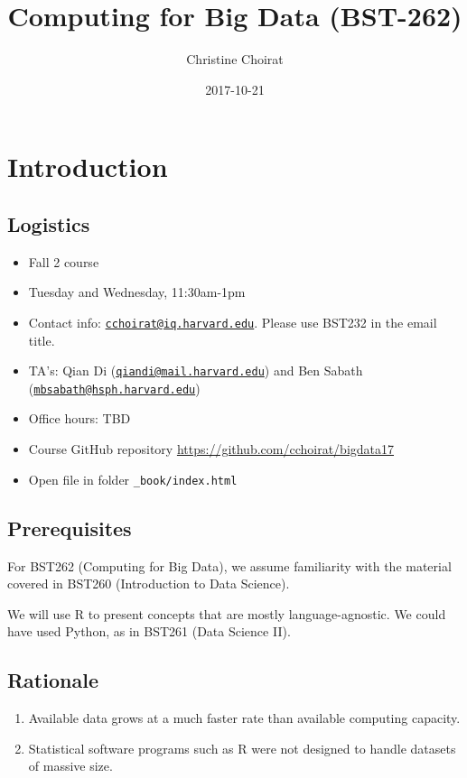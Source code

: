 \documentclass[]{book}
\title{Computing for Big Data (BST-262)}
\author{Christine Choirat}
\date{2017-10-21}
\providecommand{\tightlist}{%
  \setlength{\itemsep}{0pt}\setlength{\parskip}{0pt}}
\theoremstyle{definition}
\theoremstyle{definition}
\theoremstyle{definition}
\theoremstyle{remark}
\begin{document}
\maketitle

{
\setcounter{tocdepth}{1}
\tableofcontents
}
\chapter{Introduction}\label{intro}

\section{Logistics}\label{logistics}

\begin{itemize}
\tightlist
\item
  Fall 2 course
\item
  Tuesday and Wednesday, 11:30am-1pm
\item
  Contact info:
  \href{mailto:cchoirat@iq.harvard.edu}{\nolinkurl{cchoirat@iq.harvard.edu}}.
  Please use BST232 in the email title.
\item
  TA's: Qian Di
  (\href{mailto:qiandi@mail.harvard.edu}{\nolinkurl{qiandi@mail.harvard.edu}})
  and Ben Sabath
  (\href{mailto:mbsabath@hsph.harvard.edu}{\nolinkurl{mbsabath@hsph.harvard.edu}})
\item
  Office hours: TBD
\item
  Course GitHub repository \url{https://github.com/cchoirat/bigdata17}
\item
  Open file in folder \texttt{\_book/index.html}
\end{itemize}

\section{Prerequisites}\label{prerequisites}

For BST262 (Computing for Big Data), we assume familiarity with the
material covered in BST260 (Introduction to Data Science).

We will use R to present concepts that are mostly language-agnostic. We
could have used Python, as in BST261 (Data Science II).

\section{Rationale}\label{rationale}

\begin{enumerate}
\def\labelenumi{\arabic{enumi}.}
\item
  Available data grows at a much faster rate than available computing
  capacity.
\item
  Statistical software programs such as R were not designed to handle
  datasets of massive size.
\end{enumerate}
\end{document}

